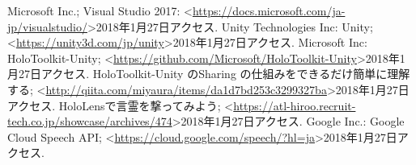 \documentclass[11pt,a4j, titlepage]{jarticle} %
\begin{document}
\begin{thebibliography}{数字}
   Microsoft Inc.; Visual Studio 2017: \textless\url{https://docs.microsoft.com/ja-jp/visualstudio/}\textgreater2018年1月27日アクセス.
   Unity Technologies Inc: Unity;  \textless\url{https://unity3d.com/jp/unity}\textgreater2018年1月27日アクセス.
   Microsoft Inc: HoloToolkit-Unity; \textless\url{https://github.com/Microsoft/HoloToolkit-Unity}\textgreater2018年1月27日アクセス.
   HoloToolkit-Unity のSharing の仕組みをできるだけ簡単に理解する; \textless\url{http://qiita.com/miyaura/items/da1d7bd253c3299327ba}\textgreater2018年1月27日アクセス.
   HoloLensで言霊を撃ってみよう;  \textless\url{https://atl-hiroo.recruit-tech.co.jp/showcase/archives/474}\textgreater2018年1月27日アクセス.
   Google Inc.: Google Cloud Speech API; \textless\url{https://cloud.google.com/speech/?hl=ja}\textgreater2018年1月27日アクセス.
\end{thebibliography}
\end{document}
